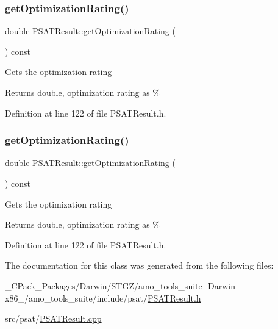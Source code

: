 \subsubsection{\texorpdfstring{get\+Optimization\+Rating()}{getOptimizationRating()}\hspace{0.1cm}{\footnotesize\ttfamily [2/3]}}
{\footnotesize\ttfamily double P\+S\+A\+T\+Result\+::get\+Optimization\+Rating (\begin{DoxyParamCaption}{ }\end{DoxyParamCaption}) const\hspace{0.3cm}{\ttfamily [inline]}}

Gets the optimization rating

\begin{DoxyReturn}{Returns}
double, optimization rating as \% 
\end{DoxyReturn}


Definition at line 122 of file P\+S\+A\+T\+Result.\+h.

\mbox{\label{class_p_s_a_t_result_aa0a7001461408fcb06a6c22ce2d064db}} 
\subsubsection{\texorpdfstring{get\+Optimization\+Rating()}{getOptimizationRating()}\hspace{0.1cm}{\footnotesize\ttfamily [3/3]}}
{\footnotesize\ttfamily double P\+S\+A\+T\+Result\+::get\+Optimization\+Rating (\begin{DoxyParamCaption}{ }\end{DoxyParamCaption}) const\hspace{0.3cm}{\ttfamily [inline]}}

Gets the optimization rating

\begin{DoxyReturn}{Returns}
double, optimization rating as \% 
\end{DoxyReturn}


Definition at line 122 of file P\+S\+A\+T\+Result.\+h.



The documentation for this class was generated from the following files\+:\begin{DoxyCompactItemize}
\item 
\+\_\+\+C\+Pack\+\_\+\+Packages/\+Darwin/\+S\+T\+G\+Z/amo\+\_\+tools\+\_\+suite-\/-\/\+Darwin-\/x86\+\_/amo\+\_\+tools\+\_\+suite/include/psat/\hyperlink{___c_pack___packages_2_darwin_2_s_t_g_z_2amo__tools__suite--_darwin-x86__64_2amo__tools__suite_2ebff217b422cb1d0ff6d2d9bd9f6ea65}{P\+S\+A\+T\+Result.\+h}\item 
src/psat/\hyperlink{_p_s_a_t_result_8cpp}{P\+S\+A\+T\+Result.\+cpp}\end{DoxyCompactItemize}
